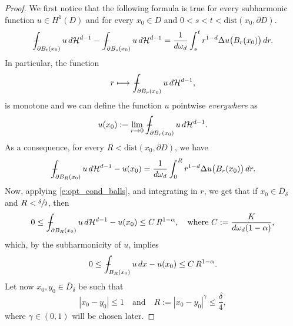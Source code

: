 \documentclass[JEP,XML,SOM,Unicode]{cedram}
\def\mto{\mathchoice{\longmapsto}{\mapsto}{\mapsto}{\mapsto}}
\theoremstyle{plain}
\theoremstyle{definition}
\def\HH{\mathcal{H}}
\newcommand{\mean}[1]{\,-\hskip-1.08em\int_{#1}}
\begin{document}
\begin{proof}
We first notice that the following formula is true for every subharmonic function $u\in H^1(D)$ and for every $x_0\in D$ and $0<s<t<\text{dist}(x_0,\partial D)$.
\[\mean{\partial B_t(x_0)}{u\,d\HH^{d-1}}-\mean{\partial B_s(x_0)}{u\,d\HH^{d-1}}=\frac{1}{d\omega_d}\int_s^t r^{1-d}\Delta u\big(B_r(x_0)\big)\,dr.\]
In particular, the function
\[r\mto \mean{\partial B_r(x_0)}{u\,d\HH^{d-1}},\]
is monotone and we can define the function $u$ pointwise {\it everywhere} as
\[u(x_0):=\lim_{r\to0}\mean{\partial B_r(x_0)}{u\,d\HH^{d-1}}.\]
As a consequence, for every $R<\text{dist}(x_0,\partial D)$, we have
\[\mean{\partial B_R(x_0)}{u\,d\HH^{d-1}}-u(x_0)=\frac{1}{d\omega_d}\int_0^R r^{1-d}\Delta u\big(B_r(x_0)\big)\,dr.\]
Now, applying \eqref{e:opt_cond_balls}, and integrating in $r$, we get that if $x_0\in \overline D_\delta$ and $R<\sfrac\delta2$, then
\begin{equation}%
0\le \mean{\partial B_R(x_0)}{u\,d\HH^{d-1}}-u(x_0)\le C\,R^{1-\alpha},\quad\text{where } C:=\frac{K}{d\omega_d(1-\alpha)},
\end{equation}
which, by the subharmonicity of $u$, implies
\begin{equation}\label{e:mean_continuity2}
0\le \mean{B_R(x_0)}{u\,dx}-u(x_0)\le C\,R^{1-\alpha}.
\end{equation}
Let now $x_0,y_0\in \overline D_\delta$ be such that
\[|x_0-y_0|\le 1\quad\text{and}\quad R:=|x_0-y_0|^{\gamma}\le \frac\delta4,\]
where $\gamma\in(0,1)$ will be chosen later.


\end{proof}
\end{document}
